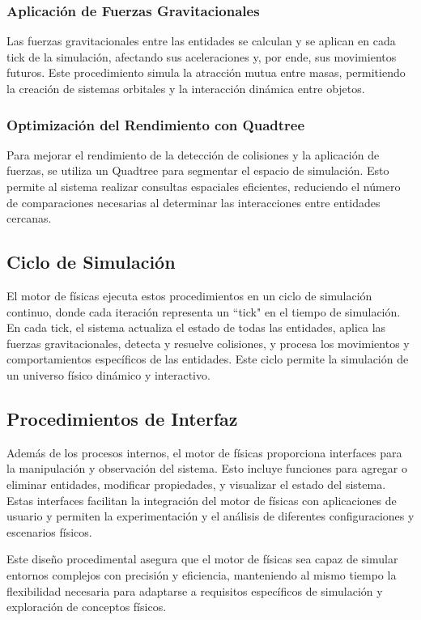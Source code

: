 \subsubsection{Aplicación de Fuerzas Gravitacionales}
Las fuerzas gravitacionales entre las entidades se calculan y se aplican en cada tick de la simulación, afectando sus aceleraciones y, por ende, sus movimientos futuros. Este procedimiento simula la atracción mutua entre masas, permitiendo la creación de sistemas orbitales y la interacción dinámica entre objetos.

\subsubsection{Optimización del Rendimiento con Quadtree}
Para mejorar el rendimiento de la detección de colisiones y la aplicación de fuerzas, se utiliza un Quadtree para segmentar el espacio de simulación. Esto permite al sistema realizar consultas espaciales eficientes, reduciendo el número de comparaciones necesarias al determinar las interacciones entre entidades cercanas.

\subsection{Ciclo de Simulación}
El motor de físicas ejecuta estos procedimientos en un ciclo de simulación continuo, donde cada iteración representa un ``tick" en el tiempo de simulación. En cada tick, el sistema actualiza el estado de todas las entidades, aplica las fuerzas gravitacionales, detecta y resuelve colisiones, y procesa los movimientos y comportamientos específicos de las entidades. Este ciclo permite la simulación de un universo físico dinámico y interactivo.

\subsection{Procedimientos de Interfaz}
Además de los procesos internos, el motor de físicas proporciona interfaces para la manipulación y observación del sistema. Esto incluye funciones para agregar o eliminar entidades, modificar propiedades, y visualizar el estado del sistema. Estas interfaces facilitan la integración del motor de físicas con aplicaciones de usuario y permiten la experimentación y el análisis de diferentes configuraciones y escenarios físicos.

Este diseño procedimental asegura que el motor de físicas sea capaz de simular entornos complejos con precisión y eficiencia, manteniendo al mismo tiempo la flexibilidad necesaria para adaptarse a requisitos específicos de simulación y exploración de conceptos físicos.

